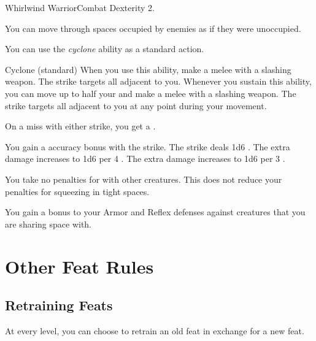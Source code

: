     \begin{feat}{Whirlwind Warrior}{Combat}
        \featpre Dexterity 2.

         You can move through spaces occupied by enemies as if they were unoccupied.

         You can use the \textit{cyclone} ability as a standard action.
        \begin{sustainability}{Cyclone}{ (standard)}
            \rankline
            When you use this ability, make a melee  with a slashing weapon.
            The strike targets all  adjacent to you.
            Whenever you sustain this ability, you can move up to half your  and make a melee  with a slashing weapon.
            The strike targets all  adjacent to you at any point during your movement.

            On a miss with either strike, you get a .

            \rankline
             You gain a  accuracy bonus with the strike.
             The strike deals 1d6 .
             The extra damage increases to 1d6 per 4 .
             The extra damage increases to 1d6 per 3 .
        \end{sustainability}

         You take no penalties for \squeezing with other creatures.
        This does not reduce your penalties for squeezing in tight spaces.

         You gain a  bonus to your Armor and Reflex defenses against creatures that you are sharing space with.
    \end{feat}

\section{Other Feat Rules}

    \subsection{Retraining Feats}
        At every level, you can choose to retrain an old feat in exchange for a new feat.
